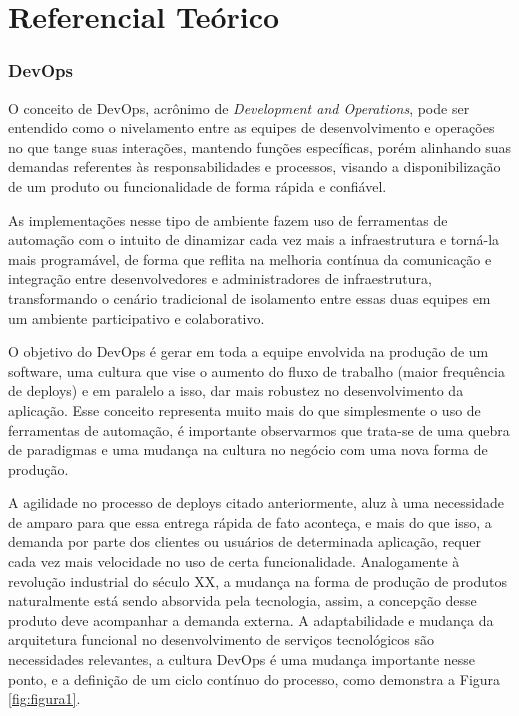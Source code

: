
\chapter{Referencial Teórico}\label{referencial_teorico}

\subsection{DevOps}
O conceito de DevOps, acrônimo de \textit{Development and Operations},  pode ser entendido como o nivelamento entre as equipes de desenvolvimento e operações no que tange suas interações, mantendo funções específicas, porém alinhando suas demandas referentes às responsabilidades e processos, visando a disponibilização de um produto ou funcionalidade de forma rápida e confiável.\cite{gartnerglossario}

As implementações nesse tipo de ambiente fazem uso de ferramentas de automação com o intuito de dinamizar cada vez mais a infraestrutura e torná-la mais programável, de forma que reflita na melhoria contínua da comunicação e integração entre desenvolvedores e administradores de infraestrutura, transformando o cenário tradicional de isolamento entre essas duas equipes em um ambiente participativo e colaborativo.\cite{costa}

O objetivo do DevOps é gerar em toda a equipe envolvida na produção de um software, uma cultura que vise o aumento do fluxo de trabalho (maior frequência de deploys) e em paralelo a isso, dar mais robustez no desenvolvimento da aplicação. Esse conceito representa muito mais do que simplesmente o uso de ferramentas de automação, é importante observarmos que trata-se de uma quebra de paradigmas e uma mudança na cultura no negócio com uma nova forma de produção.\cite{sato2014devops}

A agilidade no processo de deploys citado anteriormente, aluz à uma necessidade de amparo para que essa entrega rápida de fato aconteça, e mais do que isso, a demanda por parte dos clientes ou usuários de determinada aplicação, requer cada vez mais velocidade no uso de certa funcionalidade. Analogamente à revolução industrial do século XX, a mudança na forma de produção de produtos naturalmente está sendo absorvida pela tecnologia, assim, a concepção desse produto deve acompanhar a demanda externa. A adaptabilidade e mudança da arquitetura funcional no desenvolvimento de serviços tecnológicos são necessidades relevantes, a cultura DevOps é uma mudança importante nesse ponto, e a definição de um ciclo contínuo do processo, como demonstra a Figura \ref{fig:figura1}.\cite{ibmdevops}

